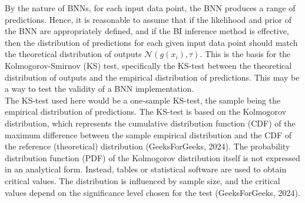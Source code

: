 \documentclass[conference]{IEEEtran}
\begin{document}
By the nature of BNNs, for each input data point, the BNN produces a range of predictions. Hence, it is reasonable to assume that if the likelihood and prior of the BNN are appropriately defined, and if the BI inference method is effective, then the distribution of predictions for each given input data point should match the theoretical distribution of outputs $\mathcal{N}(g(x_i), \tau)$. This is the basis for the Kolmogorov-Smirnov (KS) test, specifically the KS-test between the theoretical distribution of outputs and the empirical distribution of predictions. This may be a way to test the validity of a BNN implementation.\\

The KS-test used here would be a one-sample KS-test, the sample being the empirical distribution of predictions. The KS-test is based on the Kolmogorov distribution, which represents the cumulative distribution function (CDF) of the maximum difference between the sample empirical distribution and the CDF of the reference (theoretical) distribution (GeeksForGeeks, 2024). The probability distribution function (PDF) of the Kolmogorov distribution itself is not expressed in an analytical form. Instead, tables or statistical software are used to obtain critical values. The distribution is influenced by sample size, and the critical values depend on the significance level chosen for the test (GeeksForGeeks, 2024).\\
\end{document}
